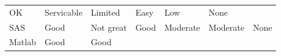 \documentclass[]{book}
\begin{document}
\begin{longtable}[]{@{}lllllll@{}}
\begin{minipage}[t]{0.11\columnwidth}
OK\strut
\end{minipage} & \begin{minipage}[t]{0.13\columnwidth}\raggedright\strut
Servicable\strut
\end{minipage} & \begin{minipage}[t]{0.16\columnwidth}\raggedright\strut
Limited\strut
\end{minipage} & \begin{minipage}[t]{0.11\columnwidth}\raggedright\strut
Easy\strut
\end{minipage} & \begin{minipage}[t]{0.17\columnwidth}\raggedright\strut
Low\strut
\end{minipage} & \begin{minipage}[t]{0.05\columnwidth}\raggedright\strut
None\strut
\end{minipage}\tabularnewline
\begin{minipage}[t]{0.08\columnwidth}\raggedright\strut
SAS\strut
\end{minipage} & \begin{minipage}[t]{0.11\columnwidth}\raggedright\strut
Good\strut
\end{minipage} & \begin{minipage}[t]{0.13\columnwidth}\raggedright\strut
Not great\strut
\end{minipage} & \begin{minipage}[t]{0.16\columnwidth}\raggedright\strut
Good\strut
\end{minipage} & \begin{minipage}[t]{0.11\columnwidth}\raggedright\strut
Moderate\strut
\end{minipage} & \begin{minipage}[t]{0.17\columnwidth}\raggedright\strut
Moderate\strut
\end{minipage} & \begin{minipage}[t]{0.05\columnwidth}\raggedright\strut
None\strut
\end{minipage}\tabularnewline
\begin{minipage}[t]{0.08\columnwidth}\raggedright\strut
Matlab\strut
\end{minipage} & \begin{minipage}[t]{0.11\columnwidth}\raggedright\strut
Good\strut
\end{minipage} & \begin{minipage}[t]{0.13\columnwidth}\raggedright\strut
Good\strut
\end{minipage} & \begin{minipage}[t]{0.16\columnwidth}\raggedright\strut

\end{minipage}
\end{longtable}
\end{document}
